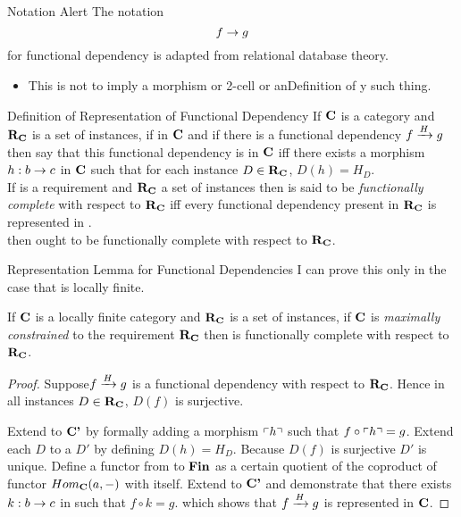 \begin{frame}{Notation Alert}
The notation 
$$
f \morph g
$$
for functional dependency is adapted from relational database theory. 

\begin{itemize}
\item This is not to imply a morphism or 2-cell or anDefinition of y such thing.
\end{itemize}
\end{frame}

\begin{frame}{Definition of Representation of Functional Dependency}
If $\catc$ is a category and $\reqtc$ is a set of instances, 
if \fgsourcediagram in $\catc$ 
and if there is a functional dependency $\fundep{H}{f}{g}$ then say that 
this functional dependency  is  in $\catc$ 
iff there exists a morphism $h:b \morph c$ in $\catc$ such that for each instance $D \in \reqtc$, $D(h)=H_D$. \\
\medskip
\pause If \catcw is a requirement and $\reqtc$ a set of instances then \catcw is said to be 
\textit{functionally complete} with respect to $\reqtc$ iff every functional dependency
present in $\reqtc$ is represented in \catc.\\
\medskip
\pause {}\IfSforCwithRCwords then \catcw ought to be functionally complete with respect to $\reqtc$.
\end{frame}

\begin{frame}{Representation Lemma for Functional Dependencies}
I can prove this only in the case that \catcw is locally finite.

\begin{lemma}
If $\catc$ is a locally finite category and $\reqtc$ is a set of instances, if $\catc$ is 
\textit{maximally constrained} to the requirement $\reqtc$ then 
\catcw is functionally complete with respect to $\reqtc$.
\end{lemma}
\begin{proof}
Suppose$\fundep{H}{f}{g}$  is a functional dependency with respect to $\reqtc$.
Hence in all instances $D \in \reqtc$, $D(f)$ is surjective.

Extend \catcw to $\catcp$ by formally adding a morphism $\qq{h}$ such that $f \circ \qq{h}=g$. Extend each $D$ to a $D'$ by defining $D(h)=H_D$. 
Because $D(f)$ is surjective $D'$ is unique. 
Define a functor from \catcw to $\Fin$ as  a certain quotient of the coproduct of functor $Hom_{\catc}(a,-)$ with itself. 
Extend to $\catcp$ and demonstrate that there exists $k:b \morph c$ in \catcw such that $f \circ k=g$. 
which shows that $\fundep{H}{f}{g}$ is represented in $\catc$.
\end{proof}
\end{frame}

